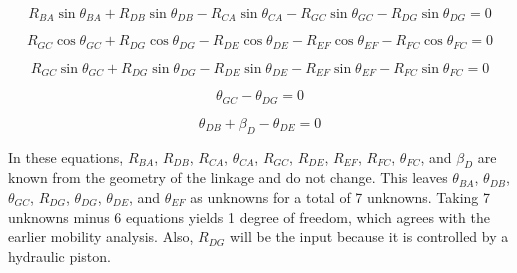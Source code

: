 \documentclass[hidelinks]{article}
\begin{document}
    \begin{equation}
        \label{eq:scalar-equation1-2}
        R_{BA}\sin\theta_{BA}+R_{DB}\sin\theta_{DB}-R_{CA}\sin\theta_{CA}-R_{GC}\sin\theta_{GC}-R_{DG}\sin\theta_{DG}=0
    \end{equation}

    \begin{equation}
        \label{eq:scalar-equation2-1}
        R_{GC}\cos\theta_{GC}+R_{DG}\cos\theta_{DG}-R_{DE}\cos\theta_{DE}-R_{EF}\cos\theta_{EF}-R_{FC}\cos\theta_{FC}=0
    \end{equation}

    \begin{equation}
        \label{eq:scalar-equation2-2}
        R_{GC}\sin\theta_{GC}+R_{DG}\sin\theta_{DG}-R_{DE}\sin\theta_{DE}-R_{EF}\sin\theta_{EF}-R_{FC}\sin\theta_{FC}=0
    \end{equation}

    \begin{equation}
        \label{eq:rigid-geometry1}
        \theta_{GC}-\theta_{DG}=0
    \end{equation}

    \begin{equation}
        \label{eq:rigid-geometry2}
        \theta_{DB}+\beta_D-\theta_{DE}=0
    \end{equation}
    
    In these equations, \(R_{BA}\), \(R_{DB}\), \(R_{CA}\), \(\theta_{CA}\), \(R_{GC}\), \(R_{DE}\), \(R_{EF}\), \(R_{FC}\), \(\theta_{FC}\), and \(\beta_D\) are known from the geometry of the linkage and do not change. This leaves \(\theta_{BA}\), \(\theta_{DB}\), \(\theta_{GC}\), \(R_{DG}\), \(\theta_{DG}\), \(\theta_{DE}\), and \(\theta_{EF}\) as unknowns for a total of 7 unknowns. Taking 7 unknowns minus 6 equations yields 1 degree of freedom, which agrees with the earlier mobility analysis. Also, \(R_{DG}\) will be the input because it is controlled by a hydraulic piston.
    
\end{document}
